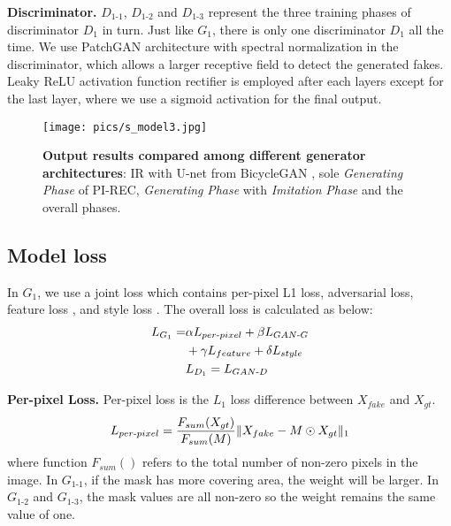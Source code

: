 \documentclass[10pt,twocolumn,letterpaper]{article} \usepackage{amsfonts,amssymb}
\begin{document}
{\bf Discriminator.}
$D_{1\text{-}1}$, $D_{1\text{-}2}$ and $D_{1\text{-}3}$ represent the three training phases of discriminator $D_1$ in turn. Just like $G_1$, there is only one discriminator $D_1$ all the time. We use PatchGAN \cite{isola2017image,yu2018free} architecture with spectral normalization \cite{miyato2018spectral} in the discriminator, which allows a larger receptive field to detect the generated fakes. Leaky ReLU activation function \cite{maas2013rectifier} rectifier is employed after each layers except for the last layer, where we use a sigmoid activation for the final output.
\begin{figure*}[t]
\centering



\texttt{[image: pics/s\_model3.jpg]}

\caption{\textbf{Output results compared among different generator architectures}: IR with U-net \cite{ronneberger2015u} from BicycleGAN \cite{zhu2017toward}, sole \emph{Generating} \emph{Phase} of PI-REC, \emph{Generating} \emph{Phase} with \emph{Imitation} \emph{Phase} and the overall phases.}
\label{Experiment.1}
\end{figure*}

\subsection{Model loss} \label{Model loss}
In $G_1$, we use a joint loss which contains per-pixel L1 loss, adversarial loss, feature loss \cite{johnson2016perceptual}, and style loss \cite{gatys2016image}. The overall
loss is calculated as below:
\begin{align}
\label{overall-loss}
L_{G_1} = &\alpha L_{per\text{-}pixel} + \beta L_{GAN\text{-}G} \\
          &+ \gamma L_{feature} + \delta L_{style}\notag\\
&L_{D_1} = L_{GAN\text{-}D}
\end{align}

{\bf Per-pixel Loss.}
Per-pixel loss is the $L_{1}$ loss difference between $X_{fake}$ and $X_{gt}$.
\begin{equation}
\label{Per-pixel Loss}
L_{per\text{-}pixel} = \frac{F_{sum}(X_{gt})}{F_{sum}(M)}\Arrowvert X_{fake} - M \odot X_{gt}\Arrowvert _{1}
\end{equation}
where function $F_{sum}()$ refers to the total number of non-zero pixels in the image. In $G_{1\text{-}1}$, if the mask has more covering area, the weight will be larger. In $G_{1\text{-}2}$ and $G_{1\text{-}3}$, the mask values are all non-zero so the weight remains the same value of one.
\end{document}
